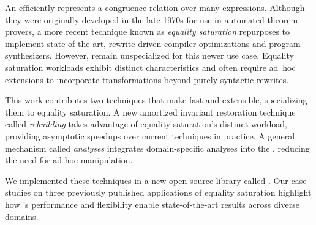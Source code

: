 An \egraph efficiently represents
  a congruence relation over many expressions.
Although they were originally developed in the late 1970s
  for use in automated theorem provers,
  a more recent technique known as \textit{equality saturation}
  repurposes \egraphs to implement state-of-the-art,
  rewrite-driven compiler optimizations and program synthesizers.
However, \egraphs remain unspecialized for this newer use case.
Equality saturation workloads exhibit distinct characteristics and
  often require ad~hoc \egraph extensions to
  incorporate transformations beyond purely syntactic rewrites.

This work contributes two techniques that make
  \egraphs fast and extensible, specializing them to equality saturation.
A new amortized invariant restoration technique called \textit{rebuilding}
  takes advantage of equality saturation's distinct workload,
  providing asymptotic speedups over current techniques in practice.
A general mechanism called \textit{\eclass analyses}
  integrates domain-specific analyses into the \egraph,
  reducing the need for ad hoc manipulation.

We implemented these techniques in
  a new open-source library called \egg.
Our case studies on
  three previously published applications of equality saturation
  highlight how \egg's performance and flexibility
  enable state-of-the-art results across diverse domains.

